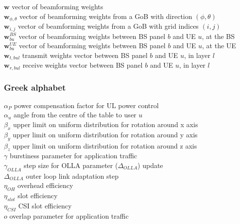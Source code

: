 $\bm{w}$ \mytab vector of beamforming weights \\
$\bm{w}_{\phi, \theta}$ \mytab vector of beamforming weights from a GoB with direction $(\phi, \theta)$ \\
$\bm{w}_{i,j}$ \mytab vector of beamforming weights from a GoB with grid indices $(i,j)$\\
$\bm{w}^{BS}_{bu}$ \mytab vector of beamforming weights between BS panel $b$ and UE $u$, at the BS \\
$\bm{w}^{UE}_{bu}$ \mytab vector of beamforming weights between BS panel $b$ and UE $u$, at the UE \\
$\bm{w}_{t, bul}$ \mytab transmit weights vector between BS panel $b$ and UE $u$, in layer $l$\\
$\bm{w}_{r, bul}$ \mytab receive weights vector between BS panel $b$ and UE $u$, in layer $l$\\



\subsubsection*{Greek alphabet}

$\alpha_P$ \mytab power compensation factor for UL power control\\
$\alpha_u$ \mytab angle from the centre of the table to user $u$\\

$\beta_x$ \mytab upper limit on uniform distribution for rotation around x axis \\
$\beta_y$ \mytab upper limit on uniform distribution for rotation around y axis \\
$\beta_z$ \mytab upper limit on uniform distribution for rotation around z axis \\

$\gamma$ \mytab burstiness parameter for application traffic\\
$\gamma_{OLLA}$ \mytab step size for OLLA parameter ($\Delta_{OLLA}$) update\\

$\Delta_{OLLA}$ \mytab outer loop link adaptation step\\

$\eta_{OH}$ \mytab overhead efficiency \\
$\eta_{slot}$ \mytab slot efficiency \\
$\eta_{CSI}$ \mytab CSI slot efficiency \\
$o$ \mytab overlap parameter for application traffic\\

